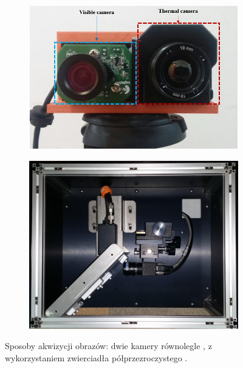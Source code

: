 \begin{figure}[h]
	\centering
	\begin{subfigure}{0.45\textwidth}
		\centering
		 \includegraphics[width=1\textwidth]{images/dual-camera}
		\subcaption{\label{dual_camera}}
	\end{subfigure}
	\begin{subfigure}{0.45\textwidth}
		\centering
		 \includegraphics[width=1\textwidth]{images/multispectral}
		\subcaption{\label{multispectral}}
	\end{subfigure}
	
	\caption{\label{fig:cameras_systems}Sposoby akwizycji obrazów:  \protect{} dwie kamery równolegle \cite{lee2015robust}, \protect{} z wykorzystaniem zwierciadła półprzezroczystego \cite{hwang2015multispectral}.}
\end{figure}


